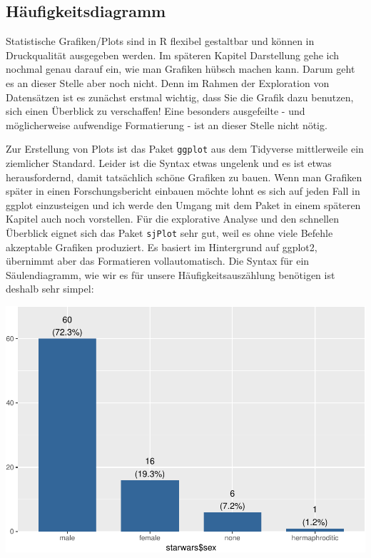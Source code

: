 \documentclass[
]{book}
\newenvironment{Shaded}{\begin{snugshade}}{\end{snugshade}}
\newcommand{\FunctionTok}[1]{\textcolor[rgb]{0.00,0.00,0.00}{#1}}
\newcommand{\NormalTok}[1]{#1}
\newcommand{\SpecialCharTok}[1]{\textcolor[rgb]{0.00,0.00,0.00}{#1}}
\begin{document}
\hypertarget{huxe4ufigkeitsdiagramm}{%
\subsection{Häufigkeitsdiagramm}\label{huxe4ufigkeitsdiagramm}}

Statistische Grafiken/Plots sind in R flexibel gestaltbar und können in Druckqualität ausgegeben werden. Im späteren Kapitel Darstellung gehe ich nochmal genau darauf ein, wie man Grafiken hübsch machen kann. Darum geht es an dieser Stelle aber noch nicht. Denn im Rahmen der Exploration von Datensätzen ist es zunächst erstmal wichtig, dass Sie die Grafik dazu benutzen, sich einen Überblick zu verschaffen! Eine besonders ausgefeilte - und möglicherweise aufwendige Formatierung - ist an dieser Stelle nicht nötig.

Zur Erstellung von Plots ist das Paket \texttt{ggplot} aus dem Tidyverse mittlerweile ein ziemlicher Standard. Leider ist die Syntax etwas ungelenk und es ist etwas herausfordernd, damit tatsächlich schöne Grafiken zu bauen. Wenn man Grafiken später in einen Forschungsbericht einbauen möchte lohnt es sich auf jeden Fall in ggplot einzusteigen und ich werde den Umgang mit dem Paket in einem späteren Kapitel auch noch vorstellen. Für die explorative Analyse und den schnellen Überblick eignet sich das Paket \texttt{sjPlot} sehr gut, weil es ohne viele Befehle akzeptable Grafiken produziert. Es basiert im Hintergrund auf ggplot2, übernimmt aber das Formatieren vollautomatisch. Die Syntax für ein Säulendiagramm, wie wir es für unsere Häufigkeitsauszählung benötigen ist deshalb sehr simpel:

\begin{Shaded}
\end{Shaded}

\includegraphics{r_book_files/figure-latex/freq_plot-1.pdf}
\end{document}
